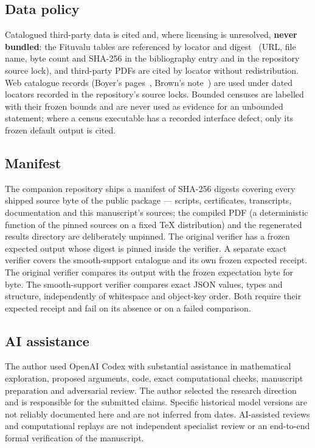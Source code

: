 \subsection{Data policy}

Catalogued third-party data is cited and, where licensing is unresolved,
\textbf{never bundled}: the Fituvalu tables are referenced by locator and
digest~\cite{FIT} (URL, file name, byte count and SHA-256 in the
bibliography entry and in the repository source lock), and third-party
PDFs are cited by locator without redistribution. Web catalogue records
(Boyer's pages~\cite{BOYWEB}, Brown's note~\cite{BRO}) are used under
dated locators recorded in the repository's source locks. Bounded censuses are labelled with their frozen
bounds and are never used as evidence for an unbounded statement; where a
census executable has a recorded interface defect, only its frozen default
output is cited.

\subsection{Manifest}

The companion repository ships a manifest of SHA-256 digests covering
every shipped source byte of the public package --- scripts, certificates,
transcripts, documentation and this manuscript's sources; the compiled PDF
(a deterministic function of the pinned sources on a fixed TeX
distribution) and the regenerated results directory are deliberately
unpinned. The original verifier has a frozen expected output whose
digest is pinned inside the verifier. A separate exact verifier covers
the smooth-support catalogue and its own frozen expected receipt. The
original verifier compares its output with the frozen expectation byte for
byte. The smooth-support verifier compares exact JSON values, types and
structure, independently of whitespace and object-key order. Both require
their expected receipt and fail on its absence or on a failed comparison.

\subsection{AI assistance}

The author used OpenAI Codex with substantial assistance in mathematical exploration, proposed arguments,
code, exact computational checks, manuscript preparation and adversarial
review. The author selected the research direction and is responsible for
the submitted claims. Specific historical model versions are not reliably
documented here and are not inferred from dates. AI-assisted reviews and
computational replays are not independent specialist review or an
end-to-end formal verification of the manuscript.

